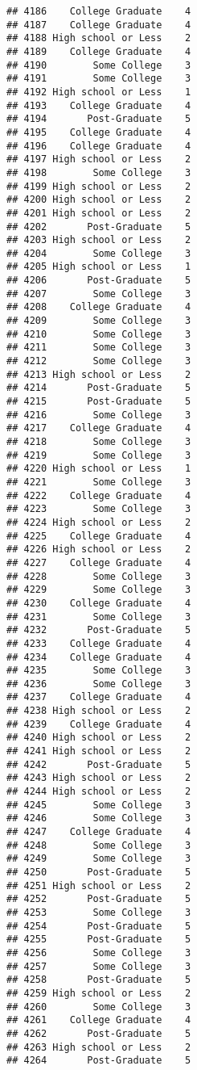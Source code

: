 \documentclass[
]{article}
\begin{document}
\begin{verbatim}
## 4186    College Graduate    4
## 4187    College Graduate    4
## 4188 High school or Less    2
## 4189    College Graduate    4
## 4190        Some College    3
## 4191        Some College    3
## 4192 High school or Less    1
## 4193    College Graduate    4
## 4194       Post-Graduate    5
## 4195    College Graduate    4
## 4196    College Graduate    4
## 4197 High school or Less    2
## 4198        Some College    3
## 4199 High school or Less    2
## 4200 High school or Less    2
## 4201 High school or Less    2
## 4202       Post-Graduate    5
## 4203 High school or Less    2
## 4204        Some College    3
## 4205 High school or Less    1
## 4206       Post-Graduate    5
## 4207        Some College    3
## 4208    College Graduate    4
## 4209        Some College    3
## 4210        Some College    3
## 4211        Some College    3
## 4212        Some College    3
## 4213 High school or Less    2
## 4214       Post-Graduate    5
## 4215       Post-Graduate    5
## 4216        Some College    3
## 4217    College Graduate    4
## 4218        Some College    3
## 4219        Some College    3
## 4220 High school or Less    1
## 4221        Some College    3
## 4222    College Graduate    4
## 4223        Some College    3
## 4224 High school or Less    2
## 4225    College Graduate    4
## 4226 High school or Less    2
## 4227    College Graduate    4
## 4228        Some College    3
## 4229        Some College    3
## 4230    College Graduate    4
## 4231        Some College    3
## 4232       Post-Graduate    5
## 4233    College Graduate    4
## 4234    College Graduate    4
## 4235        Some College    3
## 4236        Some College    3
## 4237    College Graduate    4
## 4238 High school or Less    2
## 4239    College Graduate    4
## 4240 High school or Less    2
## 4241 High school or Less    2
## 4242       Post-Graduate    5
## 4243 High school or Less    2
## 4244 High school or Less    2
## 4245        Some College    3
## 4246        Some College    3
## 4247    College Graduate    4
## 4248        Some College    3
## 4249        Some College    3
## 4250       Post-Graduate    5
## 4251 High school or Less    2
## 4252       Post-Graduate    5
## 4253        Some College    3
## 4254       Post-Graduate    5
## 4255       Post-Graduate    5
## 4256        Some College    3
## 4257        Some College    3
## 4258       Post-Graduate    5
## 4259 High school or Less    2
## 4260        Some College    3
## 4261    College Graduate    4
## 4262       Post-Graduate    5
## 4263 High school or Less    2
## 4264       Post-Graduate    5

\end{verbatim}
\end{document}
